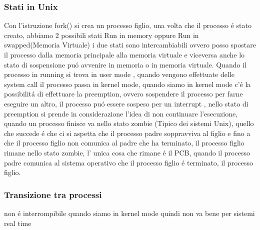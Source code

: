 \subsubsection{Stati in Unix}
Con l'istruzione fork() si crea un processo figlio,
una volta che il processo é stato creato, abbiamo 2 possibili stati Run in memory oppure Run in swapped(Memoria Virtuale)
i due stati sono intercambiabili ovvero posso spostare il processo dalla memoria principale alla memoria virtuale e viceversa
anche lo stato di sospensione puó avvenire in memoria o in memoria virtuale. Quando il processo in running si trova in user mode
, quando vengono effettuate delle system call il processo passa in kernel mode, quando siamo in kernel mode c'é la possibilitá di
effettuare la preemption, ovvero sospendere il processo per farne eseguire un altro, il processo puó essere sospeso per un interrupt
, nello stato di preemption si prende in considerazione l'idea di non continuare l'esecuzione, quando un processo finisce va
nello stato zombie (Tipico dei sistemi Unix), quello che succede é che ci si aspetta che il processo padre soppravviva al figlio
e fino a che il processo figlio non comunica al padre che ha terminato, il processo figlio rimane nello stato zombie, l' unica cosa
che rimane é il PCB, quando il processo padre comunica al sistema operativo che il processo figlio é terminato, il processo figlio.
\subsubsection{Transizione tra processi}
non é interrompibile quando siamo in kernel mode quindi non va bene per sistemi real time
